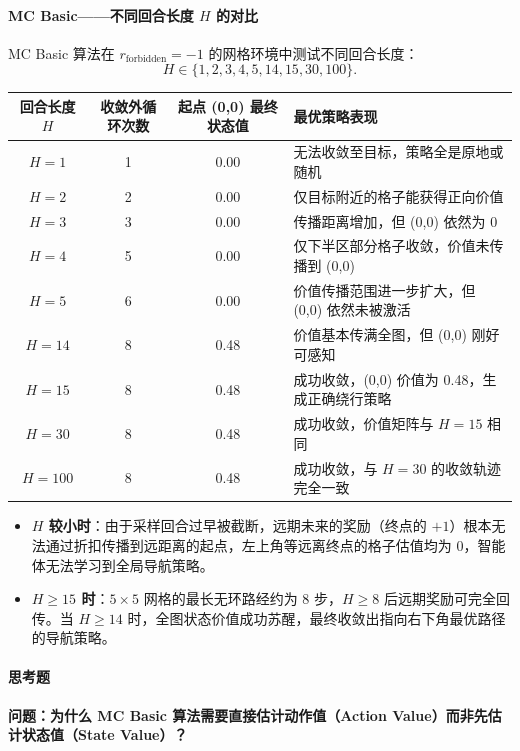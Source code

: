 \documentclass[11pt,a4paper,UTF8]{ctexart}
\numberwithin{figure}{section}
\numberwithin{table}{section}
\begin{document}
\paragraph{MC Basic——不同回合长度 $H$ 的对比}

MC Basic 算法在 $r_\text{forbidden}=-1$ 的网格环境中测试不同回合长度：
\[
H\in\{1,2,3,4,5,14,15,30,100\}.
\]

\begin{table}[H]
\centering
\begin{tabular}{cccC{5.2cm}}
\toprule
回合长度 $H$ & 收敛外循环次数 & 起点 (0,0) 最终状态值 & 最优策略表现 \\
\midrule
$H=1$ & 1 & 0.00 & 无法收敛至目标，策略全是原地或随机 \\
$H=2$ & 2 & 0.00 & 仅目标附近的格子能获得正向价值 \\
$H=3$ & 3 & 0.00 & 传播距离增加，但 (0,0) 依然为 0 \\
$H=4$ & 5 & 0.00 & 仅下半区部分格子收敛，价值未传播到 (0,0) \\
$H=5$ & 6 & 0.00 & 价值传播范围进一步扩大，但 (0,0) 依然未被激活 \\
$H=14$ & 8 & 0.48 & 价值基本传满全图，但 (0,0) 刚好可感知 \\
$H=15$ & 8 & 0.48 & 成功收敛，(0,0) 价值为 0.48，生成正确绕行策略 \\
$H=30$ & 8 & 0.48 & 成功收敛，价值矩阵与 $H=15$ 相同 \\
$H=100$ & 8 & 0.48 & 成功收敛，与 $H=30$ 的收敛轨迹完全一致 \\
\bottomrule
\end{tabular}
\end{table}

\begin{itemize}
\item \textbf{$H$ 较小时}：由于采样回合过早被截断，远期未来的奖励（终点的 $+1$）根本无法通过折扣传播到远距离的起点，左上角等远离终点的格子估值均为 $0$，智能体无法学习到全局导航策略。
\item \textbf{$H \ge 15$ 时}：$5 \times 5$ 网格的最长无环路经约为 8 步，$H \ge 8$ 后远期奖励可完全回传。当 $H \ge 14$ 时，全图状态价值成功苏醒，最终收敛出指向右下角最优路径的导航策略。
\end{itemize}

\paragraph{思考题}


\textbf{问题：为什么 MC Basic 算法需要直接估计动作值（Action Value）而非先估计状态值（State Value）？}
\end{document}
